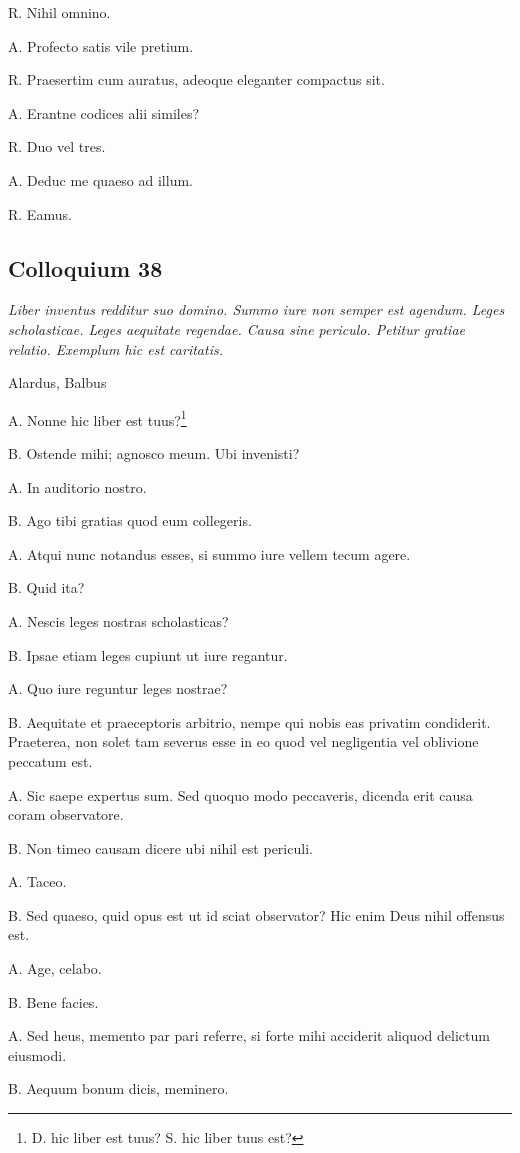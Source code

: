 \documentclass{article}
\begin{document}
R. Nihil omnino.

A. Profecto satis vile pretium.

R. Praesertim cum auratus, adeoque eleganter compactus sit.

A. Erantne codices alii similes?

R. Duo vel tres.

A. Deduc me quaeso ad illum.

R. Eamus.

\subsection{Colloquium 38}
\emph{Liber inventus redditur suo domino. Summo iure non semper est agendum. Leges scholasticae. Leges aequitate regendae. Causa sine periculo. Petitur gratiae relatio. Exemplum hic est caritatis.}

Alardus, Balbus

A. Nonne hic liber est tuus?\footnote{D. hic liber est tuus? S. hic liber tuus est?}

B. Ostende mihi; agnosco meum. Ubi invenisti?

A. In auditorio nostro.

B. Ago tibi gratias quod eum collegeris.

A. Atqui nunc notandus esses, si summo iure vellem tecum agere.

B. Quid ita?

A. Nescis leges nostras scholasticas?

B. Ipsae etiam leges cupiunt ut iure regantur.

A. Quo iure reguntur leges nostrae?

B. Aequitate et praeceptoris arbitrio, nempe qui nobis eas privatim condiderit. Praeterea, non solet tam severus esse in eo quod vel negligentia vel oblivione peccatum est.

A. Sic saepe expertus sum. Sed quoquo modo peccaveris, dicenda erit causa coram observatore.

B. Non timeo causam dicere ubi nihil est periculi.

A. Taceo.

B. Sed quaeso, quid opus est ut id sciat observator? Hic enim Deus nihil offensus est.

A. Age, celabo.

B. Bene facies.

A. Sed heus, memento par pari referre, si forte mihi acciderit aliquod delictum eiusmodi.

B. Aequum bonum dicis, meminero.
\end{document}
